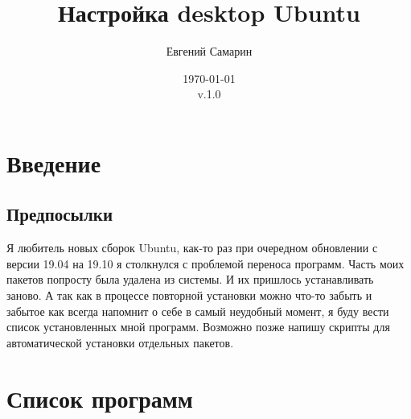 \documentclass[a4paper, 12pt]{report}
\author{Евгений Самарин}
\title{Настройка desktop Ubuntu}
\date{\today\\v.1.0}
\begin{document}
\maketitle

\tableofcontents
\clearpage

\chapter{Введение}
\section{Предпосылки}

Я любитель новых сборок Ubuntu, как-то раз при очередном обновлении с версии 19.04 на 19.10 я столкнулся с проблемой переноса программ. Часть моих пакетов попросту была удалена из системы. И их пришлось устанавливать заново. А так как в процессе повторной установки можно что-то забыть и забытое как всегда напомнит о себе в самый неудобный момент, я буду вести список установленных мной программ. Возможно позже напишу скрипты для автоматической установки отдельных пакетов.

\chapter{Список программ}
\end{document}
